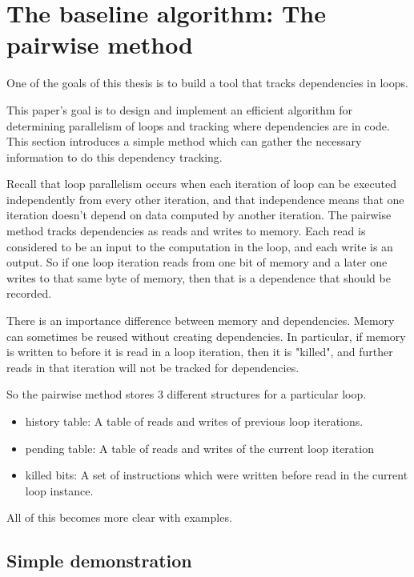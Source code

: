 \documentclass[12pt,twoside]{reedthesis}
\begin{document}
	\section{The baseline algorithm: The pairwise method}
	
		One of the goals of this thesis is to build a tool that tracks dependencies in loops. 
		
		This paper's goal is to design and implement an efficient algorithm for determining parallelism of loops and tracking where dependencies are in code. This section introduces a simple method which can gather the necessary information to do this dependency tracking. 
		
		Recall that loop parallelism occurs when each iteration of loop can be executed independently from every other iteration, and that independence means that one iteration doesn't depend on data computed by another iteration. 
		The pairwise method tracks dependencies as reads and writes to memory. Each read is considered to be an input to the computation in the loop, and each write is an output. So if one loop iteration reads from one bit of memory and a later one writes to that same byte of memory, then that is a dependence that should be recorded. 
		
		There is an importance difference between memory and dependencies. Memory can sometimes be reused without creating dependencies. In particular, if memory is written to before it is read in a loop iteration, then it is "killed", and further reads in that iteration will not be tracked for dependencies. 
		
		So the pairwise method stores 3 different structures for a particular loop. 
		
		\begin{itemize}
			\item history table: A table of reads and writes of previous loop iterations.
			\item pending table: A table of reads and writes of the current loop iteration
			\item killed bits: A set of instructions which were written before read in the current loop instance. 
		\end{itemize}
	
		All of this becomes more clear with examples.
		
		
		
		\subsection{Simple demonstration}
		
\end{document}
